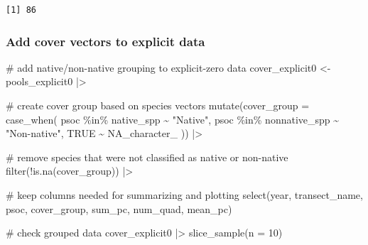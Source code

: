 \documentclass[
  letterpaper,
  DIV=11,
  numbers=noendperiod]{scrartcl}
\newenvironment{Shaded}{\begin{snugshade}}{\end{snugshade}}
\newcommand{\AttributeTok}[1]{\textcolor[rgb]{0.40,0.45,0.13}{#1}}
\newcommand{\CommentTok}[1]{\textcolor[rgb]{0.37,0.37,0.37}{#1}}
\newcommand{\ConstantTok}[1]{\textcolor[rgb]{0.56,0.35,0.01}{#1}}
\newcommand{\DecValTok}[1]{\textcolor[rgb]{0.68,0.00,0.00}{#1}}
\newcommand{\FunctionTok}[1]{\textcolor[rgb]{0.28,0.35,0.67}{#1}}
\newcommand{\NormalTok}[1]{\textcolor[rgb]{0.00,0.23,0.31}{#1}}
\newcommand{\OtherTok}[1]{\textcolor[rgb]{0.00,0.23,0.31}{#1}}
\newcommand{\SpecialCharTok}[1]{\textcolor[rgb]{0.37,0.37,0.37}{#1}}
\newcommand{\StringTok}[1]{\textcolor[rgb]{0.13,0.47,0.30}{#1}}
\begin{document}
\begin{verbatim}
[1] 86
\end{verbatim}

\subsubsection{Add cover vectors to explicit
data}\label{add-cover-vectors-to-explicit-data}

\begin{Shaded}
\begin{Highlighting}[]
\CommentTok{\# add native/non{-}native grouping to explicit{-}zero data}
\NormalTok{cover\_explicit0 }\OtherTok{\textless{}{-}}\NormalTok{ pools\_explicit0 }\SpecialCharTok{|\textgreater{}}
  
  \CommentTok{\# create cover group based on species vectors}
  \FunctionTok{mutate}\NormalTok{(}\AttributeTok{cover\_group =} \FunctionTok{case\_when}\NormalTok{(}
\NormalTok{    psoc }\SpecialCharTok{\%in\%}\NormalTok{ native\_spp }\SpecialCharTok{\textasciitilde{}} \StringTok{"Native"}\NormalTok{,}
\NormalTok{    psoc }\SpecialCharTok{\%in\%}\NormalTok{ nonnative\_spp }\SpecialCharTok{\textasciitilde{}} \StringTok{"Non{-}native"}\NormalTok{,}
    \ConstantTok{TRUE} \SpecialCharTok{\textasciitilde{}} \ConstantTok{NA\_character\_}
\NormalTok{  )) }\SpecialCharTok{|\textgreater{}}
  
  \CommentTok{\# remove species that were not classified as native or non{-}native}
  \FunctionTok{filter}\NormalTok{(}\SpecialCharTok{!}\FunctionTok{is.na}\NormalTok{(cover\_group)) }\SpecialCharTok{|\textgreater{}}
  
  \CommentTok{\# keep columns needed for summarizing and plotting}
  \FunctionTok{select}\NormalTok{(year,}
\NormalTok{         transect\_name,}
\NormalTok{         psoc,}
\NormalTok{         cover\_group,}
\NormalTok{         sum\_pc,}
\NormalTok{         num\_quad,}
\NormalTok{         mean\_pc)}

\CommentTok{\# check grouped data}
\NormalTok{cover\_explicit0 }\SpecialCharTok{|\textgreater{}}
  \FunctionTok{slice\_sample}\NormalTok{(}\AttributeTok{n =} \DecValTok{10}\NormalTok{)}
\end{Highlighting}
\end{Shaded}
\end{document}
